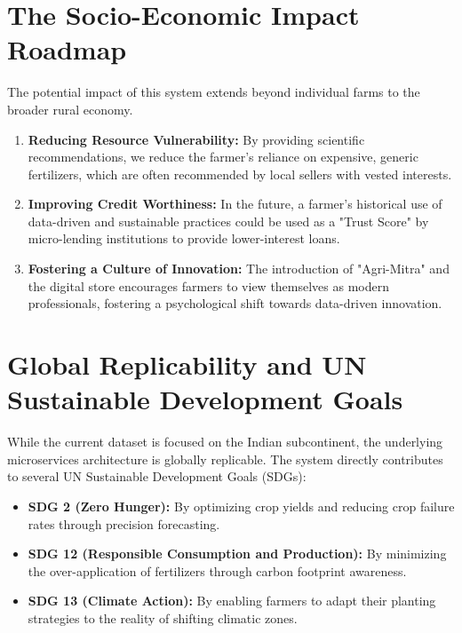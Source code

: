 \documentclass[12pt,a4paper]{report}
\begin{document}
\section{The Socio-Economic Impact Roadmap}
The potential impact of this system extends beyond individual farms to the broader rural economy.
\begin{enumerate}
    \item \textbf{Reducing Resource Vulnerability:} By providing scientific recommendations, we reduce the farmer's reliance on expensive, generic fertilizers, which are often recommended by local sellers with vested interests.
    \item \textbf{Improving Credit Worthiness:} In the future, a farmer's historical use of data-driven and sustainable practices could be used as a "Trust Score" by micro-lending institutions to provide lower-interest loans.
    \item \textbf{Fostering a Culture of Innovation:} The introduction of "Agri-Mitra" and the digital store encourages farmers to view themselves as modern professionals, fostering a psychological shift towards data-driven innovation.
\end{enumerate}

\section{Global Replicability and UN Sustainable Development Goals}
While the current dataset is focused on the Indian subcontinent, the underlying microservices architecture is globally replicable. The system directly contributes to several UN Sustainable Development Goals (SDGs):
\begin{itemize}
    \item \textbf{SDG 2 (Zero Hunger):} By optimizing crop yields and reducing crop failure rates through precision forecasting.
    \item \textbf{SDG 12 (Responsible Consumption and Production):} By minimizing the over-application of fertilizers through carbon footprint awareness.
    \item \textbf{SDG 13 (Climate Action):} By enabling farmers to adapt their planting strategies to the reality of shifting climatic zones.
\end{itemize}
\end{document}

